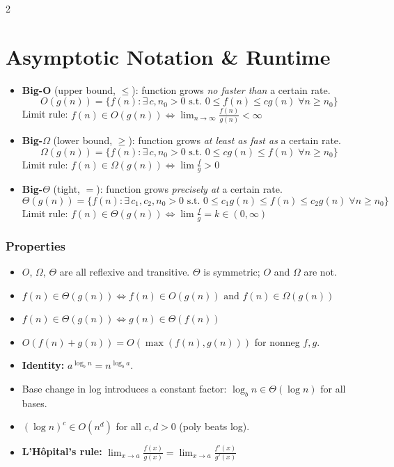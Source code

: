 \documentclass[9pt]{article}
\begin{document}
\begin{multicols}{2}
\section*{Asymptotic Notation \& Runtime}

\begin{itemize}
  \item \textbf{Big-O} (upper bound, $\leq$): function grows \emph{no faster than} a certain rate.
  $$O(g(n))=\{f(n):\exists\,c,n_0>0\text{ s.t. }0\le f(n)\le cg(n)\;\forall n\ge n_0\}$$
  Limit rule: $f(n)\in O(g(n))\iff\lim_{n\to\infty}\frac{f(n)}{g(n)}<\infty$
  \item \textbf{Big-$\Omega$} (lower bound, $\geq$): function grows \emph{at least as fast as} a certain rate.
  $$\Omega(g(n))=\{f(n):\exists\,c,n_0>0\text{ s.t. }0\le cg(n)\le f(n)\;\forall n\ge n_0\}$$
  Limit rule: $f(n)\in\Omega(g(n))\iff\lim\frac{f}{g}>0$
  \item \textbf{Big-$\Theta$} (tight, $=$): function grows \emph{precisely at} a certain rate.
  $$\Theta(g(n))=\{f(n):\exists\,c_1,c_2,n_0>0\text{ s.t. }0\le c_1g(n)\le f(n)\le c_2g(n)\;\forall n\ge n_0\}$$
  Limit rule: $f(n)\in\Theta(g(n))\iff\lim\frac{f}{g}=k\in(0,\infty)$
\end{itemize}

\subsubsection*{Properties}

\begin{itemize}
  \item $O$, $\Omega$, $\Theta$ are all reflexive and transitive. $\Theta$ is symmetric; $O$ and $\Omega$ are not.
  \item $f(n)\in\Theta(g(n))\iff f(n)\in O(g(n))\text{ and }f(n)\in\Omega(g(n))$
  \item $f(n)\in\Theta(g(n))\iff g(n)\in\Theta(f(n))$
  \item $O(f(n)+g(n))=O(\max(f(n),g(n)))$ for nonneg $f,g$.
  \item \textbf{Identity:} $a^{\log_b n}=n^{\log_b a}$.
  \item Base change in log introduces a constant factor: $\log_b n\in\Theta(\log n)$ for all bases.
  \item $(\log n)^c\in O(n^d)$ for all $c,d>0$ (poly beats log).
  \item \textbf{L'H\^opital's rule:} $\displaystyle\lim_{x\to a}\frac{f(x)}{g(x)}=\lim_{x\to a}\frac{f'(x)}{g'(x)}$
\end{itemize}


\end{multicols}
\end{document}
